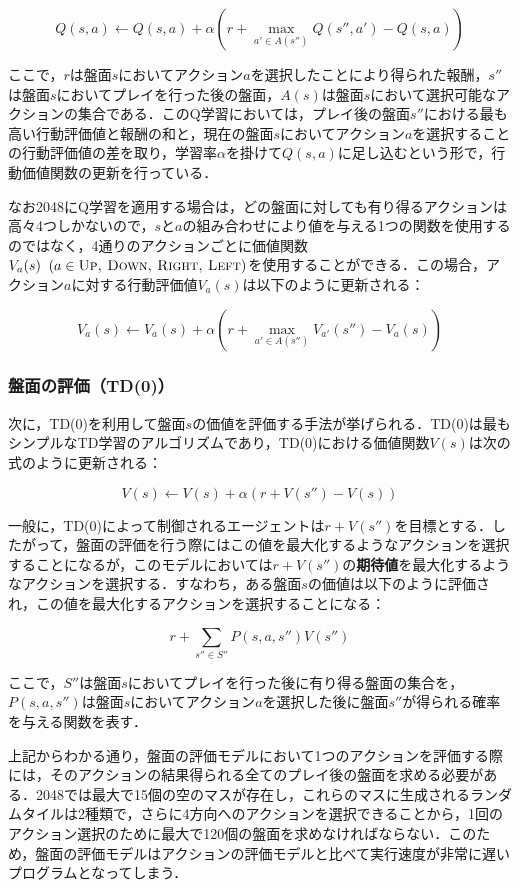 \documentclass{suribt}
\begin{document}
\[
	Q(s,a) \leftarrow Q(s,a) + {\alpha} (r + \max_{a' \in A(s'')} Q(s'', a') - Q(s,a))
\]

ここで，$r$は盤面$s$においてアクション$a$を選択したことにより得られた報酬，$s''$は盤面$s$においてプレイを行った後の盤面，$A(s)$は盤面$s$において選択可能なアクションの集合である．このQ学習においては，プレイ後の盤面$s''$における最も高い行動評価値と報酬の和と，現在の盤面$s$においてアクション$a$を選択することの行動評価値の差を取り，学習率${\alpha}$を掛けて$Q(s,a)$に足し込むという形で，行動価値関数の更新を行っている．

なお2048にQ学習を適用する場合は，どの盤面に対しても有り得るアクションは高々4つしかないので，$s$と$a$の組み合わせにより値を与える1つの関数を使用するのではなく，4通りのアクションごとに価値関数$V_a(s) \;\; (a \in \text{\textsc{Up, Down, Right, Left}})$を使用することができる\cite{Szubert}．この場合，アクション$a$に対する行動評価値$V_a(s)$は以下のように更新される：

\[
	V_a(s) \leftarrow V_a(s) + {\alpha} (r + \max_{a' \in A(s'')} V_{a'}(s'') - V_a(s))
\]

\subsubsection{盤面の評価（TD(0)）}
次に，TD(0)を利用して盤面$s$の価値を評価する手法が挙げられる．TD(0)は最もシンプルなTD学習のアルゴリズムであり，TD(0)における価値関数$V(s)$は次の式のように更新される：

\[
	V(s) \leftarrow V(s) + \alpha (r + V(s'') - V(s) )
\]

一般に，TD(0)によって制御されるエージェントは$r+V(s'')$を目標とする\cite{Sutton}．したがって，盤面の評価を行う際にはこの値を最大化するようなアクションを選択することになるが，このモデルにおいては$r+V(s'')$の\textbf{期待値}を最大化するようなアクションを選択する．すなわち，ある盤面$s$の価値は以下のように評価され，この値を最大化するアクションを選択することになる：

\[
	r + \sum_{s'' \in S''} P(s,a,s'')V(s'')
\]

ここで，$S''$は盤面$s$においてプレイを行った後に有り得る盤面の集合を，$P(s,a,s'')$は盤面$s$においてアクション$a$を選択した後に盤面$s''$が得られる確率を与える関数を表す．

上記からわかる通り，盤面の評価モデルにおいて1つのアクションを評価する際には，そのアクションの結果得られる全てのプレイ後の盤面を求める必要がある．2048では最大で15個の空のマスが存在し，これらのマスに生成されるランダムタイルは2種類で，さらに4方向へのアクションを選択できることから，1回のアクション選択のために最大で120個の盤面を求めなければならない．このため，盤面の評価モデルはアクションの評価モデルと比べて実行速度が非常に遅いプログラムとなってしまう．
\end{document}
